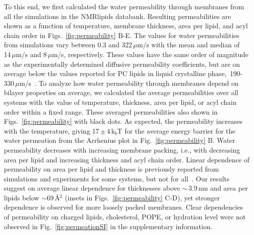 \documentclass[fleqn,10pt]{wlscirep}
\begin{document}
To this end, we first calculated the water permeability through membranes from all the simulations in the NMRlipids databank. Resulting permeabilities are shown as a function of temperature, membrane thickness, area per lipid, and acyl chain order in Figs.~\ref{fig:permeability} B-E. The values for water permeabilities from simulations vary between 0.3 and 322\,$\mu$m/s with the mean and median of 14\,$\mu$m/s and 8\,$\mu$m/s, respectively. These values have the same order of magnitude as the experimentally determined diffusive permeability coefficients, but are on average below the values reported for PC lipids in liquid crystalline phase,~190-330\,$\mu$m/s~\cite{jansen95}. To analyze how water permeability through membranes depend on bilayer properties on average, we calculated the average permeabilities over all systems with the value of temperature, thickness, area per lipid, or acyl chain order within a fixed range. These averaged permeabilities also shown in Figs.~\ref{fig:permeability} with black dots. As expected, the permeability increases with the temperature, giving 17\,$\pm$\,4\,k$_b$T for the average energy barrier for the water permeation from the Arrhenius plot in Fig.~\ref{fig:permeability} B. Water permeability decreases with increasing membrane packing, i.e., with decreasing area per lipid and increasing thickness and acyl chain order. Linear dependence of permeability on area per lipid and thickness is previously reported from simulations and experiments for some systems, but not for all~\cite{mathai07,venable19,frallicciardi22}. Our results suggest on average linear dependence for thicknesses above $\sim$\,3.9\,nm and area per lipids below $\sim$69\,Å$^2$ (insets in Figs.~\ref{fig:permeability} C-D), yet stronger dependence is observed for more loosely packed membranes. 
Clear dependencies of permeability on charged lipids, cholesterol, POPE, or hydration level were not observed in Fig.~\ref{fig:permeationSI} in the supplementary information.
\end{document}
